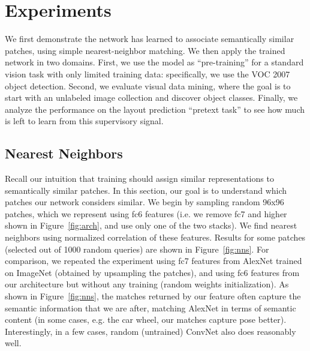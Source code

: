 \documentclass[10pt,twocolumn,letterpaper]{article}
\begin{document}
\vspace{-0.1in}
\section{Experiments}
\vspace{-0.05in}



We first demonstrate the network has learned to associate semantically similar patches, using simple nearest-neighbor matching.  We then apply the trained network in two domains.  
First, we use the model as ``pre-training'' for a standard vision task with only limited training data: specifically, we use the VOC 2007 object detection.  Second, we evaluate visual data mining, where the goal is to start with an unlabeled image collection and discover object classes. 
Finally, we analyze the performance on the layout prediction ``pretext task'' to see how much is left to learn from this supervisory signal.

\vspace{-0.05in}
\subsection{Nearest Neighbors}\label{sec:nns}
\vspace{-0.05in}
Recall our intuition that training should assign similar representations to semantically similar patches.  In this section, our goal is to understand which patches our network considers similar.
We begin by sampling random 96x96 patches, which we represent using fc6 features (i.e. we remove fc7 and higher shown in Figure~\ref{fig:arch}, and use only one of the two stacks).  We find nearest neighbors using normalized correlation of these features.  Results for some patches (selected out of 1000 random queries) are shown in Figure~\ref{fig:nns}.
For comparison, we repeated the experiment using fc7 features from AlexNet trained on ImageNet (obtained by upsampling the patches), and using fc6 features from our architecture but without any training (random weights initialization).  As shown in Figure~\ref{fig:nns}, the matches returned by our feature often capture the semantic information that we are after, matching AlexNet in terms of semantic content (in some cases, e.g. the car wheel, our matches capture pose better). Interestingly, in a few cases, random (untrained) ConvNet also does reasonably well.  






\vspace{-0.05in}
\end{document}
